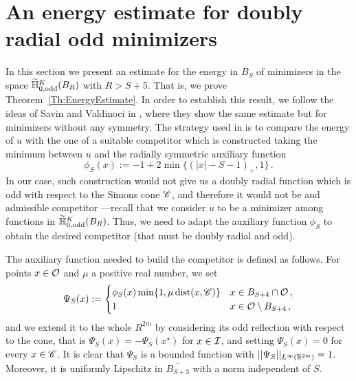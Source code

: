 \section{An energy estimate for doubly radial odd minimizers}
\label{Sec:EnergyEstimate}

In this section we present an estimate for the energy in $B_S$ of minimizers in the space $\widetilde{\mathbb{H}}^K_{0, \mathrm{odd}}(B_R)$ with $R > S+ 5$. That is, we prove Theorem~\ref{Th:EnergyEstimate}. In order to establish this result, we follow the ideas of Savin and Valdinoci in \cite{SavinValdinoci-EnergyEstimate}, where they show the same estimate but for minimizers without any symmetry. The strategy used in \cite{SavinValdinoci-EnergyEstimate} is to compare the energy of $u$ with the one of a suitable competitor which is constructed taking the minimum between $u$ and the radially symmetric auxiliary function
\begin{equation}
	\label{Eq:DefPhiS}
	\phi_S (x) :=-1+2\min\{(|x|-S-1)_+,1\}\,.
\end{equation}
In our case, such construction would not give us a doubly radial function which is odd with respect to the Simons cone $\mathscr{C}$, and therefore it would not be and admissible competitor ---recall that we consider $u$ to be a minimizer among functions in $\widetilde{\mathbb{H}}^K_{0, \mathrm{odd}}(B_R)$. Thus, we need to adapt the auxiliary function $\phi_S$ to obtain the desired  competitor (that must be doubly radial and odd).

The auxiliary function needed to build the competitor is defined as follows. For points $x\in \mathcal{O}$ and $\mu$ a positive real number, we set
\begin{equation}
	\label{Eq:DefPsiS}
\Psi_S(x) := 
\begin{cases}
\phi_S (x) \min \{1,\mu\operatorname{dist}(x,\mathscr{C})\} &  x \in B_{S+4}\cap \mathcal{O}\,, \\
1 &  x \in \mathcal{O} \setminus B_{S+4}\,,
\end{cases}
\end{equation}
and we extend it to the whole $R^{2m}$ by considering its odd reflection with respect to the cone, that is $\Psi_S(x) = -\Psi_S(x^\star)$ for $x\in \mathcal{I}$, and setting $\Psi_S (x)=0$ for every $x\in \mathscr{C}$. It is clear that $\Psi_S$ is a bounded function with $||\Psi_S||_{L^\infty(\mathbb{R}^{2m})}=1$. Moreover, it is uniformly Lipschitz in $\overline{B_{S+3}}$ with a norm independent of $S$.

